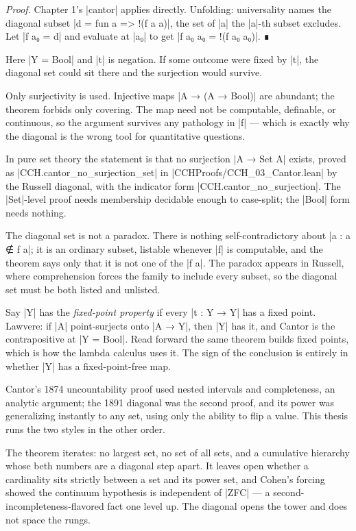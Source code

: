 \documentclass{memoir}
\begin{document}
\emph{Proof.} Chapter 1's \LeanVerb|cantor| applies directly. Unfolding: universality names
the diagonal subset \LeanVerb|d = fun a => !(f a a)|, the set of \LeanVerb|a| the \LeanVerb|a|-th subset
excludes. Let \LeanVerb|f a₀ = d| and evaluate at \LeanVerb|a₀| to get \LeanVerb|f a₀ a₀ = !(f a₀ a₀)|. ∎

Here \LeanVerb|Y = Bool| and \LeanVerb|t| is negation. If some outcome were fixed by \LeanVerb|t|, the
diagonal set could sit there and the surjection would survive.

Only surjectivity is used. Injective maps \LeanVerb|A → (A → Bool)| are abundant; the
theorem forbids only covering. The map need not be computable, definable, or
continuous, so the argument survives any pathology in \LeanVerb|f| — which is exactly why
the diagonal is the wrong tool for quantitative questions.

In pure set theory the statement is that no surjection \LeanVerb|A → Set A| exists,
proved as \LeanVerb|CCH.cantor_no_surjection_set| in \LeanVerb|CCHProofs/CCH_03_Cantor.lean| by
the Russell diagonal, with the indicator form \LeanVerb|CCH.cantor_no_surjection|. The
\LeanVerb|Set|-level proof needs membership decidable enough to case-split; the \LeanVerb|Bool|
form needs nothing.

The diagonal set is not a paradox. There is nothing self-contradictory about \LeanVerb|a : a ∉ f a|;
it is an ordinary subset, listable whenever \LeanVerb|f| is computable, and the theorem
says only that it is not one of the \LeanVerb|f a|. The paradox appears in Russell, where
comprehension forces the family to include every subset, so the diagonal set
must be both listed and unlisted.

Say \LeanVerb|Y| has the \emph{fixed-point property} if every \LeanVerb|t : Y → Y| has a fixed point.
Lawvere: if \LeanVerb|A| point-surjects onto \LeanVerb|A → Y|, then \LeanVerb|Y| has it, and Cantor is the
contrapositive at \LeanVerb|Y = Bool|. Read forward the same theorem builds fixed points,
which is how the lambda calculus uses it. The sign of the conclusion is entirely
in whether \LeanVerb|Y| has a fixed-point-free map.

Cantor's 1874 uncountability proof used nested intervals and completeness, an
analytic argument; the 1891 diagonal was the second proof, and its power was
generalizing instantly to any set, using only the ability to flip a value. This
thesis runs the two styles in the other order.

The theorem iterates: no largest set, no set of all sets, and a cumulative
hierarchy whose beth numbers are a diagonal step apart. It leaves open whether a
cardinality sits strictly between a set and its power set, and Cohen's forcing
showed the continuum hypothesis is independent of \LeanVerb|ZFC| — a
second-incompleteness-flavored fact one level up. The diagonal opens the tower
and does not space the rungs.
\end{document}
